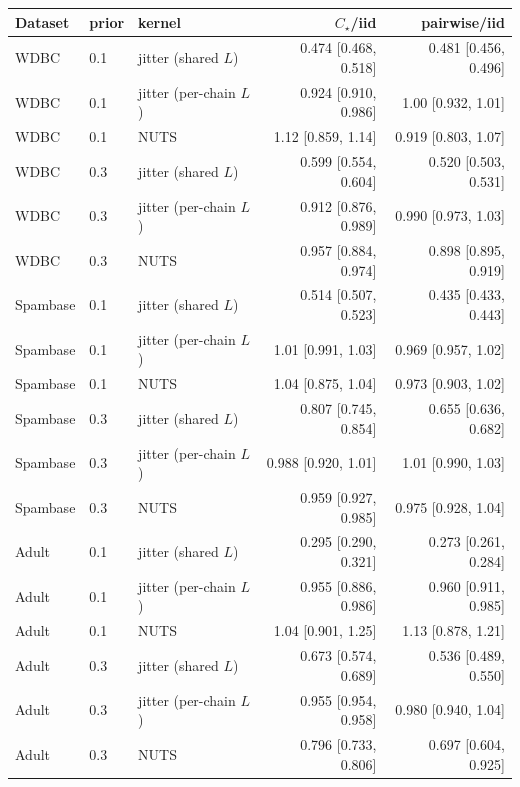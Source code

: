 \begin{tabular}{lllrr}
\toprule
Dataset & prior & kernel & $C_\star$/iid & pairwise/iid \\
\midrule
WDBC & 0.1 & jitter (shared $L$) & 0.474 [0.468, 0.518] & 0.481 [0.456, 0.496] \\
WDBC & 0.1 & jitter (per-chain $L$) & 0.924 [0.910, 0.986] & 1.00 [0.932, 1.01] \\
WDBC & 0.1 & NUTS & 1.12 [0.859, 1.14] & 0.919 [0.803, 1.07] \\
\addlinespace
WDBC & 0.3 & jitter (shared $L$) & 0.599 [0.554, 0.604] & 0.520 [0.503, 0.531] \\
WDBC & 0.3 & jitter (per-chain $L$) & 0.912 [0.876, 0.989] & 0.990 [0.973, 1.03] \\
WDBC & 0.3 & NUTS & 0.957 [0.884, 0.974] & 0.898 [0.895, 0.919] \\
\addlinespace
Spambase & 0.1 & jitter (shared $L$) & 0.514 [0.507, 0.523] & 0.435 [0.433, 0.443] \\
Spambase & 0.1 & jitter (per-chain $L$) & 1.01 [0.991, 1.03] & 0.969 [0.957, 1.02] \\
Spambase & 0.1 & NUTS & 1.04 [0.875, 1.04] & 0.973 [0.903, 1.02] \\
\addlinespace
Spambase & 0.3 & jitter (shared $L$) & 0.807 [0.745, 0.854] & 0.655 [0.636, 0.682] \\
Spambase & 0.3 & jitter (per-chain $L$) & 0.988 [0.920, 1.01] & 1.01 [0.990, 1.03] \\
Spambase & 0.3 & NUTS & 0.959 [0.927, 0.985] & 0.975 [0.928, 1.04] \\
\addlinespace
Adult & 0.1 & jitter (shared $L$) & 0.295 [0.290, 0.321] & 0.273 [0.261, 0.284] \\
Adult & 0.1 & jitter (per-chain $L$) & 0.955 [0.886, 0.986] & 0.960 [0.911, 0.985] \\
Adult & 0.1 & NUTS & 1.04 [0.901, 1.25] & 1.13 [0.878, 1.21] \\
\addlinespace
Adult & 0.3 & jitter (shared $L$) & 0.673 [0.574, 0.689] & 0.536 [0.489, 0.550] \\
Adult & 0.3 & jitter (per-chain $L$) & 0.955 [0.954, 0.958] & 0.980 [0.940, 1.04] \\
Adult & 0.3 & NUTS & 0.796 [0.733, 0.806] & 0.697 [0.604, 0.925] \\
\bottomrule
\end{tabular}
